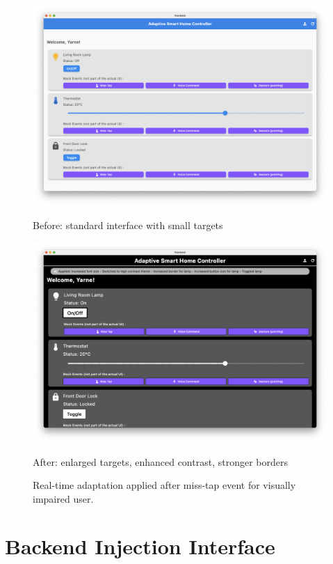 \documentclass[openany]{book}
\begin{document}
\begin{figure}[H]
\centering
\begin{minipage}{.5\linewidth}
    \includegraphics[width=\linewidth]{images/fig_ui_overview.png}
    \caption*{Before: standard interface with small targets}
\end{minipage}\hfill
\begin{minipage}{.5\linewidth}
    \includegraphics[width=\linewidth]{images/fig_adapt_after.png}
    \caption*{After: enlarged targets, enhanced contrast, stronger borders}
\end{minipage}
\caption{Real-time adaptation applied after miss-tap event for visually impaired user.}
\label{fig:before-after-adaptation}
\end{figure}

\section{Backend Injection Interface}
\end{document}
